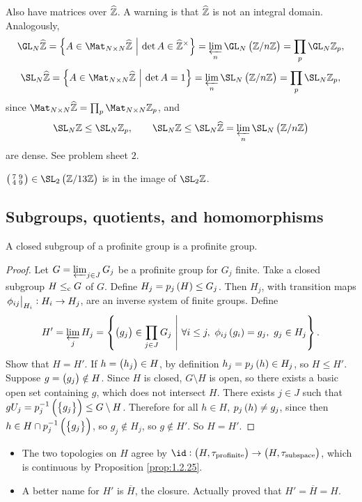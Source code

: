 Also have matrices over $ \widehat{\mathbb{Z}} $. A warning is that $ \widehat{\mathbb{Z}} $ is not an integral domain. Analogously,
$$ \GL_N \widehat{\ZZ} = \cbr{A \in \Mat_{N \times N} \widehat{\ZZ} \st \det A \in \widehat{\ZZ}^\times} = \varprojlim_n \GL_N \br{\ZZ / n\ZZ} = \prod_p \GL_N \ZZ_p, $$
$$ \SL_N \widehat{\ZZ} = \cbr{A \in \Mat_{N \times N} \widehat{\ZZ} \st \det A = 1} = \varprojlim_n \SL_N \br{\ZZ / n\ZZ} = \prod_p \SL_N \ZZ_p, $$
since $ \Mat_{N \times N} \widehat{\ZZ} = \prod_p \Mat_{N \times N} \ZZ_p $, and
$$ \SL_N \ZZ \le \SL_N \ZZ_p, \qquad \SL_N \ZZ \le \SL_N \widehat{\ZZ} = \varprojlim_n \SL_N \br{\ZZ / n\ZZ} $$
are dense. See problem sheet $ 2 $.

\begin{example}
$ \twobytwosmall{7}{9}{4}{9} \in \SL_2 \br{\ZZ / 13\ZZ} $ is in the image of $ \SL_2 \ZZ $.
\end{example}

\pagebreak

\subsection{Subgroups, quotients, and homomorphisms}

\begin{proposition}
A closed subgroup of a profinite group is a profinite group.
\end{proposition}

\begin{proof}
Let $ G = \varprojlim_{j \in J} G_j $ be a profinite group for $ G_j $ finite. Take a closed subgroup $ H \le_{\mathrm{c}} G $ of $ G $. Define $ H_j = p_j\br{H} \le G_j $. Then $ H_j $, with transition maps $ \left. \phi_{ij} \right|_{H_i} : H_i \to H_j $, are an inverse system of finite groups. Define
$$ H' = \varprojlim_j H_j = \cbr{\br{g_j} \in \prod_{j \in J} G_j \st \forall i \le j, \ \phi_{ij}\br{g_i} = g_j, \ g_j \in H_j}. $$
Show that $ H = H' $. If $ h = \br{h_j} \in H $, by definition $ h_j = p_j\br{h} \in H_j $, so $ H \le H' $. Suppose $ g = \br{g_j} \notin H $. Since $ H $ is closed, $ G \setminus H $ is open, so there exists a basic open set containing $ g $, which does not intersect $ H $. There exists $ j \in J $ such that $ gU_j = p_j^{-1}\br{\cbr{g_j}} \le G \setminus H $. Therefore for all $ h \in H $, $ p_j\br{h} \ne g_j $, since then $ h \in H \cap p_j^{-1}\br{\cbr{g_j}} $, so $ g_j \notin H_j $, so $ g \notin H' $. So $ H = H' $.
\end{proof}

\begin{remark}
\hfill
\begin{itemize}
\item The two topologies on $ H $ agree by $ \id : \br{H, \tau_{\text{profinite}}} \to \br{H, \tau_{\text{subspace}}} $, which is continuous by Proposition \ref{prop:1.2.25}.
\item A better name for $ H' $ is $ \overline{H} $, the closure. Actually proved that $ H' = \overline{H} = H $.
\end{itemize}
\end{remark}

